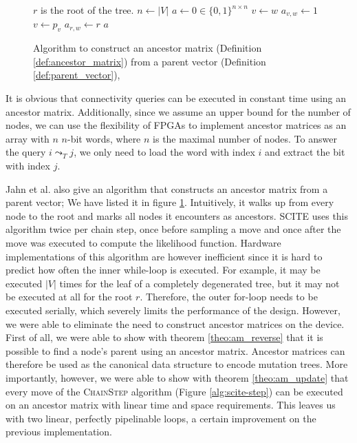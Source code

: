 \begin{figure}[p]
    \begin{algorithmic}[1]
         \Comment $r$ is the root of the tree.
            \State $n \leftarrow |V|$
            \State $a \leftarrow 0 \in \{0,1\}^{n \times n}$
                \State $v \leftarrow w$
                    \State $a_{v, w} \leftarrow 1$
                    \State $v \leftarrow p_v$
                \EndWhile
                \State $a_{r, w} \leftarrow r$
            \EndFor
            \State \Return $a$
        \EndFunction
    \end{algorithmic}
    \caption{Algorithm to construct an ancestor matrix (Definition \ref{def:ancestor_matrix}) from a parent vector (Definition \ref{def:parent_vector}), \cite{tree2016}}
    \label{alg:ancestor_matrix}
\end{figure}

It is obvious that connectivity queries can be executed in constant time using an ancestor matrix. Additionally, since we assume an upper bound for the number of nodes, we can use the flexibility of \acp{FPGA} to implement ancestor matrices as an array with $n$ $n$-bit words, where $n$ is the maximal number of nodes. To answer the query $i \leadsto_T j$, we only need to load the word with index $i$ and extract the bit with index $j$.

Jahn et al. \cite{tree2016} also give an algorithm that constructs an ancestor matrix from a parent vector; We have listed it in figure \ref{alg:ancestor_matrix}. Intuitively, it walks up from every node to the root and marks all nodes it encounters as ancestors. \ac{SCITE} uses this algorithm twice per chain step, once before sampling a move and once after the move was executed to compute the likelihood function. Hardware implementations of this algorithm are however inefficient since it is hard to predict how often the inner while-loop is executed. For example, it may be executed $|V|$ times for the leaf of a completely degenerated tree, but it may not be executed at all for the root $r$. Therefore, the outer for-loop needs to be executed serially, which severely limits the performance of the design. However, we were able to eliminate the need to construct ancestor matrices on the device. First of all, we were able to show with theorem \ref{theo:am_reverse} that it is possible to find a node's parent using an ancestor matrix. Ancestor matrices can therefore be used as the canonical data structure to encode mutation trees. More importantly, however, we were able to show with theorem \ref{theo:am_update} that every move of the \textsc{ChainStep} algorithm (Figure \ref{alg:scite-step}) can be executed on an ancestor matrix with linear time and space requirements. This leaves us with two linear, perfectly pipelinable loops, a certain improvement on the previous implementation.

